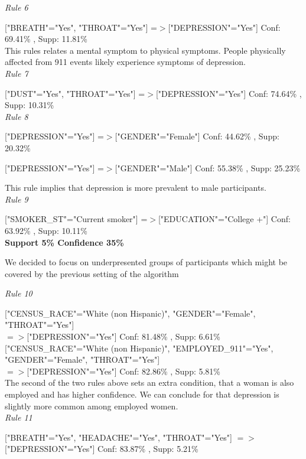 \documentclass[11pt]{article}
\begin{document}
\textit{Rule 6}

["BREATH"="Yes", "THROAT"="Yes"] =$>$["DEPRESSION"="Yes"] Conf: 69.41\% , Supp: 11.81\%  \\

This rules relates a mental symptom to physical symptoms. People physically affected from 911 events likely experience symptoms
of depression. \\

\textit{Rule 7}

["DUST"="Yes", "THROAT"="Yes"] =$>$["DEPRESSION"="Yes"] Conf: 74.64\% , Supp: 10.31\%  \\

\textit{Rule 8}

["DEPRESSION"="Yes"] =$>$["GENDER"="Female"] Conf: 44.62\% , Supp: 20.32\%  

["DEPRESSION"="Yes"] =$>$["GENDER"="Male"] Conf: 55.38\% , Supp: 25.23\% 

This rule implies that depression is more prevalent to male participants. \\

\textit{Rule 9}

["SMOKER\_ST"="Current smoker"] =$>$["EDUCATION"="College +"] Conf: 63.92\% , Supp: 10.11\%  \\

\textbf{Support 5\% Confidence 35\%}

We decided to focus on underpresented groups of participants which might be covered by the previous setting of the algorithm

\textit{Rule 10}

["CENSUS\_RACE"="White (non Hispanic)", "GENDER"="Female", "THROAT"="Yes"] \\
$=>$["DEPRESSION"="Yes"] Conf: 81.48\% , Supp: 6.61\%   \\

["CENSUS\_RACE"="White (non Hispanic)", "EMPLOYED\_911"="Yes", "GENDER"="Female", "THROAT"="Yes"]\\
 $=>$["DEPRESSION"="Yes"] Conf: 82.86\% , Supp: 5.81\%  \\

The second of the two rules above sets an extra condition, that a woman is also employed and has higher confidence. We can conclude for that depression
is slightly more common among employed women. \\

\textit{Rule 11}

["BREATH"="Yes", "HEADACHE"="Yes", "THROAT"="Yes"] $=>$ ["DEPRESSION"="Yes"] Conf: 83.87\% , Supp: 5.21\%  \\
\end{document}

